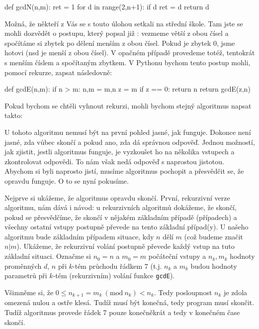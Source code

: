 \begin{python}
def gcdN(n,m):
    ret = 1
    for d in range(2,n+1):
        if d %
            ret = d
    return d
\end{python}

Možná, že někteří z Vás se s touto úlohou setkali na střední škole. Tam jste se mohli dozvědět o postupu, který 
popsal již : vezmeme větší z obou čísel a spočítáme si zbytek po dělení menším z obou čísel. Pokud je
zbytek 0, jsme hotovi (nsd je menší z obou čísel). V opačném případě provedeme totéž, tentokrát s menším číslem 
a spočítaným zbytkem. V Pythonu bychom tento postup mohli, pomocí rekurze, zapsat následovně:

\begin{python}
def gcdE(n,m):
    if n > m:
        n,m = m,n
    z = m %
    if z == 0:
        return n
    return gcdE(z,n)
\end{python}

Pokud bychom se chtěli vyhnout rekurzi, mohli bychom stejný algoritmus napsat takto:


U tohoto algoritmu nemusí být na první pohled jasné, jak funguje. Dokonce není jasné, zda vůbec skončí a pokud ano, zda
dá správnou odpověď.  Jednou možností, jak zjistit, jestli algoritmus funguje, je vyzkoušet ho na několika vstupech a 
zkontrolovat odpovědi. To nám však nedá odpověď s naprostou jistotou.  Abychom si byli naprosto jistí, musíme
algoritmus pochopit a přesvědčit se, že opravdu funguje. O to se nyní pokusíme. 

Nejprve si ukážeme, že
algoritmus opravdu skončí.  První, rekurzivní verze algoritmu, nám dává i návod: u rekurzivních algoritmů dokážeme,
že skončí, pokud se přesvědčíme, že skončí v nějakém základním případě (případech) a všechny ostatní vstupy postupně převede
na tento základní případ(y).  U našeho algoritmu bude základním případem situace, kdy $n$ dělí $m$ (což budeme značit $n|m$).  Ukážeme, že rekurzivní volání
postupně převede každý vstup na tuto základní situaci. Označme si $n_0 = n$ a $m_0=m$ počáteční vstupy a $n_k, m_k$ hodnoty proměnných 
$d$, $n$ při $k$-tém průchodu řádkem 7 (t.j. $n_k$ a $m_k$ budou hodnoty parametrů při $k$-tém (rekurzivním) volání funkce {\tt gcdE}).

Všimněme si, že $0\leq n_{k+1} = m_k\ (\mbox{mod}\ n_k) <n_k$. Tedy posloupnost $n_k$ je zdola omezená
nulou a ostře klesá. Tudíž musí být konečná, tedy program musí skončit. Tudíž algoritmus provede řádek 7 pouze konečněkrát a tedy v konečném
čase skončí. 

